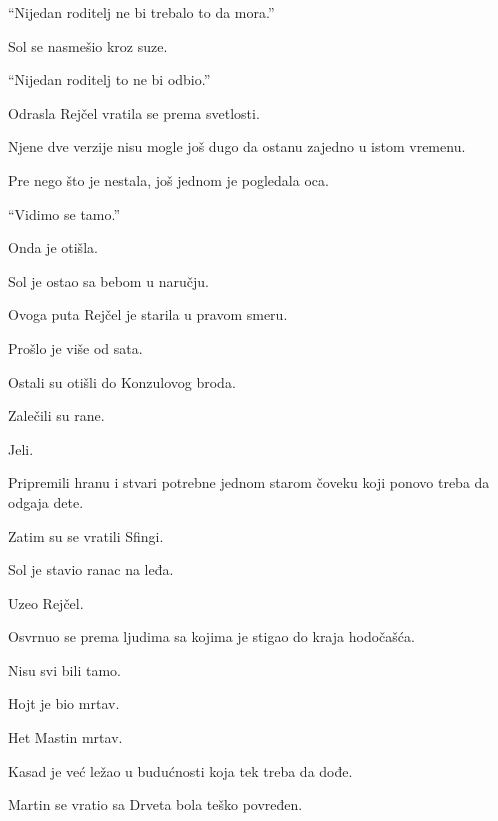 ``Nijedan roditelj ne bi trebalo to da mora.''

\bigskip

Sol se nasmešio kroz suze.

``Nijedan roditelj to ne bi odbio.''

\bigskip

Odrasla Rejčel vratila se prema svetlosti.

\bigskip

Njene dve verzije nisu mogle još dugo da ostanu zajedno u istom vremenu.

\bigskip

Pre nego što je nestala, još jednom je pogledala oca.

\bigskip

``Vidimo se tamo.''

\bigskip

Onda je otišla.

\bigskip

Sol je ostao sa bebom u naručju.

\bigskip

Ovoga puta Rejčel je starila u pravom smeru.

\bigskip

Prošlo je više od sata.

\bigskip

Ostali su otišli do Konzulovog broda.

Zalečili su rane.

Jeli.

Pripremili hranu i stvari potrebne jednom starom čoveku koji ponovo treba da odgaja dete.

\bigskip

Zatim su se vratili Sfingi.

\bigskip

Sol je stavio ranac na leđa.

Uzeo Rejčel.

\bigskip

Osvrnuo se prema ljudima sa kojima je stigao do kraja hodočašća.

\bigskip

Nisu svi bili tamo.

\bigskip

Hojt je bio mrtav.

Het Mastin mrtav.

Kasad je već ležao u budućnosti koja tek treba da dođe.

Martin se vratio sa Drveta bola teško povređen.

